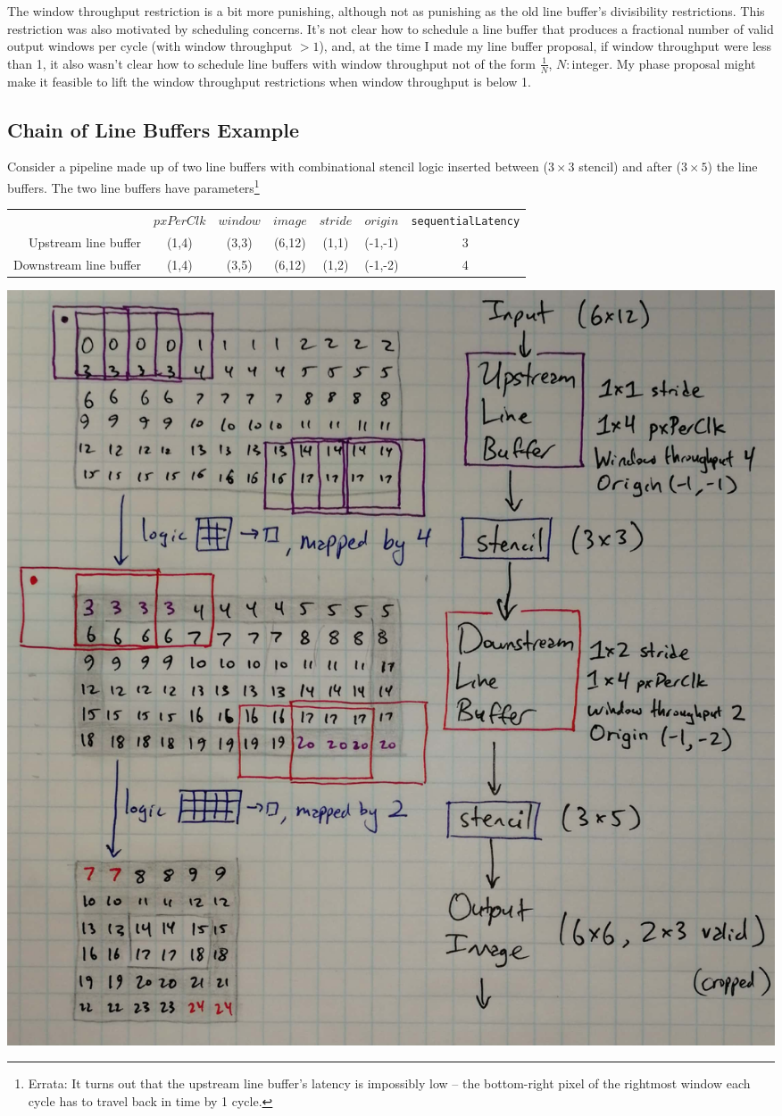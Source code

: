 \documentclass[12pt]{article}
\begin{document}
The window throughput restriction is a bit more punishing, although
not as punishing as the old line buffer's divisibility restrictions.
This restriction was also motivated by scheduling concerns. It's not
clear how to schedule a line buffer that produces a fractional number
of valid output windows per cycle (with window throughput $>1$), and,
at the time I made my line buffer proposal, if window throughput were
less than 1, it also wasn't clear how to schedule line buffers with
window throughput not of the form $\frac{1}{N}$, $N:$integer. My phase
proposal might make it feasible to lift the window throughput
restrictions when window throughput is below 1.

\subsection{Chain of Line Buffers Example}

Consider a pipeline made up of two line buffers with combinational
stencil logic inserted between ($3 \times 3$ stencil) and after ($3
\times 5$) the line buffers. The two line buffers have
parameters\footnote{ Errata: It turns out that the upstream line
  buffer's latency is impossibly low -- the bottom-right pixel of the
  rightmost window each cycle has to travel back in time by 1 cycle.}
\begin{center}
\begin{tabular}{r|c c c c c c}
& $pxPerClk$ & $window$ & $image$ & $stride$ & $origin$ &
\texttt{sequentialLatency}
\\
Upstream line buffer & (1,4) & (3,3) & (6,12) & (1,1) & (-1,-1) & 3
\\
Downstream line buffer & (1,4) & (3,5) & (6,12) & (1,2) & (-1,-2) & 4
\end{tabular}
\end{center}

\begin{center}
\includegraphics[width=1.0\linewidth]{Figures/lb-chain.jpg}
\end{center}
\end{document}

